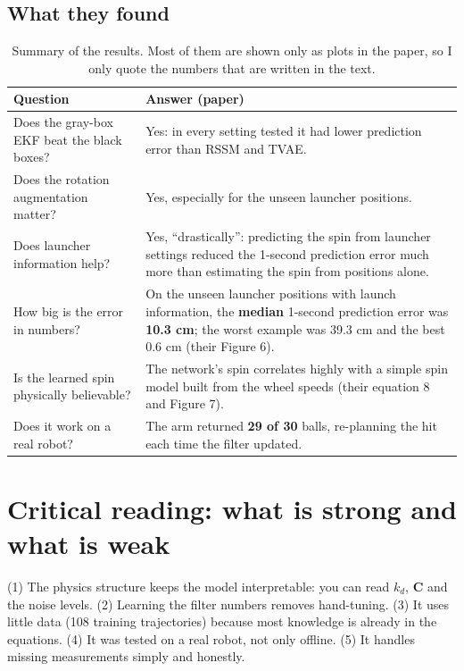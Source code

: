 \documentclass[11pt,a4paper]{article}
\begin{document}
\subsection{What they found}
\begin{table}[htbp]
\centering
\small
\renewcommand{\arraystretch}{1.25}
\begin{tabularx}{\textwidth}{@{}p{4.3cm}X@{}}
\toprule
Question & Answer (paper) \\
\midrule
Does the gray-box EKF beat the black boxes? & Yes: in every setting tested it had lower prediction error than RSSM and TVAE. \\
Does the rotation augmentation matter? & Yes, especially for the unseen launcher positions. \\
Does launcher information help? & Yes, ``drastically'': predicting the spin from launcher settings reduced the 1-second prediction error much more than estimating the spin from positions alone. \\
How big is the error in numbers? & On the unseen launcher positions with launch information, the \textbf{median} 1-second prediction error was \textbf{10.3 cm}; the worst example was 39.3 cm and the best 0.6 cm (their Figure 6). \\
Is the learned spin physically believable? & The network's spin correlates highly with a simple spin model built from the wheel speeds (their equation 8 and Figure 7). \\
Does it work on a real robot? & The arm returned \textbf{29 of 30} balls, re-planning the hit each time the filter updated. \\
\bottomrule
\end{tabularx}
\caption{Summary of the results. Most of them are shown only as plots in the paper, so I only quote the numbers that are written in the text.}
\end{table}

\section{Critical reading: what is strong and what is weak}

\begin{idea}[Strengths]
(1) The physics structure keeps the model interpretable: you can read $k_d$, $\mathbf C$ and the noise
levels. (2) Learning the filter numbers removes hand-tuning. (3) It uses little data (108 training
trajectories) because most knowledge is already in the equations. (4) It was tested on a real
robot, not only offline. (5) It handles missing measurements simply and honestly.
\end{idea}
\end{document}
